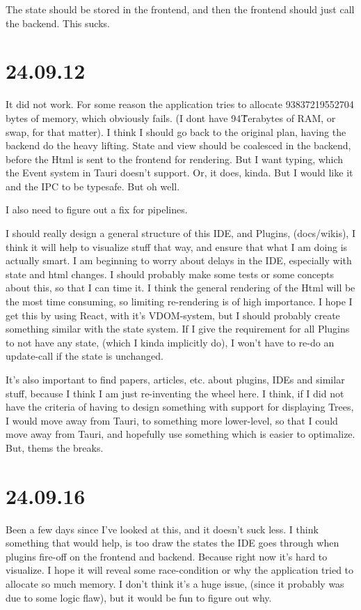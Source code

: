The state should be stored in the frontend, and then the frontend should just
call the backend. This sucks.


\section{24.09.12}

It did not work. For some reason the application tries to allocate
93837219552704 bytes of memory, which obviously fails. (I dont have 94\~
Terabytes of RAM, or swap, for that matter). I think I should go back to the
original plan, having the backend do the heavy lifting. State and view should be
coalesced in the backend, before the Html is sent to the frontend for rendering.
But I want typing, which the Event system in Tauri doesn't support. Or, it does,
kinda. But I would like it and the IPC to be typesafe. But oh well.

I also need to figure out a fix for pipelines.

I should really design a general structure of this IDE, and Plugins,
(docs/wikis), I think it will help to visualize stuff that way, and ensure that
what I am doing is actually smart. I am beginning to worry about delays in the
IDE, especially with state and html changes. I should probably make some tests
or some concepts about this, so that I can time it. I think the general
rendering of the Html will be the most time consuming, so limiting re-rendering
is of high importance. I hope I get this by using React, with it's VDOM-system,
but I should probably create something similar with the state system. If I give
the requirement for all Plugins to not have any state, (which I kinda implicitly
do), I won't have to re-do an update-call if the state is unchanged.

It's also important to find papers, articles, etc. about plugins, IDEs and
similar stuff, because I think I am just re-inventing the wheel here. I think,
if I did not have the criteria of having to design something with support for
displaying Trees, I would move away from Tauri, to something more lower-level,
so that I could move away from Tauri, and hopefully use something which is
easier to optimalize. But, thems the breaks.


\section{24.09.16}

Been a few days since I've looked at this, and it doesn't suck less. I think
something that would help, is too draw the states the IDE goes through when
plugins fire-off on the frontend and backend. Because right now it's hard to
visualize. I hope it will reveal some race-condition or why the application
tried to allocate so much memory. I don't think it's a huge issue, (since it
probably was due to some logic flaw), but it would be fun to figure out why.

